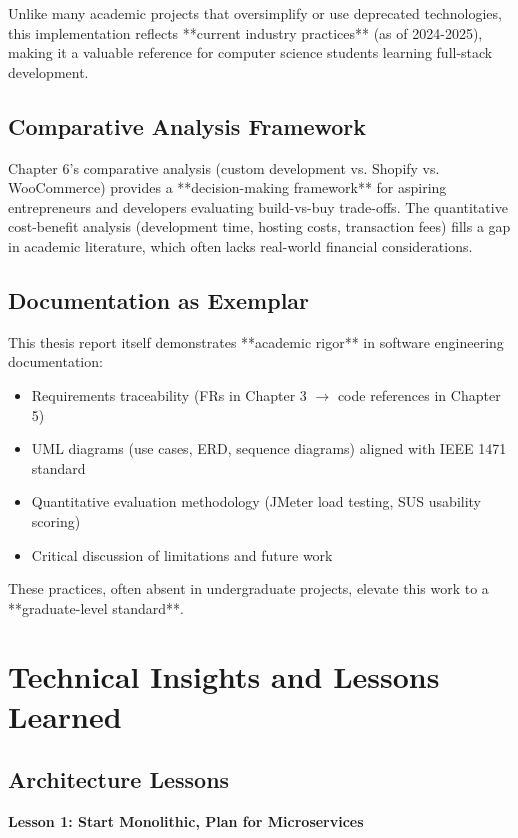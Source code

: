 \documentclass[12pt, a4paper]{report}
\begin{document}
Unlike many academic projects that oversimplify or use deprecated technologies, this implementation reflects **current industry practices** (as of 2024-2025), making it a valuable reference for computer science students learning full-stack development.

\subsection{Comparative Analysis Framework}

Chapter 6's comparative analysis (custom development vs. Shopify vs. WooCommerce) provides a **decision-making framework** for aspiring entrepreneurs and developers evaluating build-vs-buy trade-offs. The quantitative cost-benefit analysis (development time, hosting costs, transaction fees) fills a gap in academic literature, which often lacks real-world financial considerations.

\subsection{Documentation as Exemplar}

This thesis report itself demonstrates **academic rigor** in software engineering documentation:
\begin{itemize}
    \item Requirements traceability (FRs in Chapter 3 $\rightarrow$ code references in Chapter 5)
    \item UML diagrams (use cases, ERD, sequence diagrams) aligned with IEEE 1471 standard
    \item Quantitative evaluation methodology (JMeter load testing, SUS usability scoring)
    \item Critical discussion of limitations and future work
\end{itemize}

These practices, often absent in undergraduate projects, elevate this work to a **graduate-level standard**.

\section{Technical Insights and Lessons Learned}

\subsection{Architecture Lessons}

\textbf{Lesson 1: Start Monolithic, Plan for Microservices}
\end{document}
